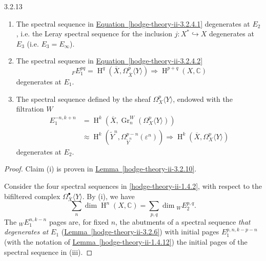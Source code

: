 \begin{corollary}{3.2.13}
    
 \begin{enumerate}
      
 \item[(i)]
        The spectral sequence in \hyperref[hodge-theory-ii-3.2.4.1]{Equation~\ref*{hodge-theory-ii-3.2.4.1}} degenerates at \(E_2\), i.e. the Leray spectral sequence for the inclusion \(j\colon  X^*\hookrightarrow  X\) degenerates at \(E_3\) (i.e. \(E_3=E_\infty \)).
      


      
 \item[(ii)]
        The spectral sequence in \hyperref[hodge-theory-ii-3.2.4.2]{Equation~\ref*{hodge-theory-ii-3.2.4.2}}
        \[           {}_FE_1^{pq}           = \operatorname {H}^q(\overline {X},\Omega _{\overline {X}}^p\langle  Y\rangle )           \Rightarrow  \operatorname {H}^{p+q}(X,\mathbb {C})         \]
        degenerates at \(E_1\).
      


      
 \item[(iii)]
        The spectral sequence defined by the sheaf \(\Omega _X^p\langle  Y\rangle \), endowed with the filtration \(W\)
        \[           \begin {aligned}             E_1^{-n,k+n}             &= \operatorname {H}^k(\overline {X},\operatorname {Gr}_n^W(\Omega _X^p\langle  Y\rangle ))           \\&\approx  \operatorname {H}^k(\widetilde {Y}^n,\Omega _{\widetilde {Y}^n}^{p-n}(\varepsilon ^n))             \Rightarrow  \operatorname {H}^k(\overline {X},\Omega _X^p\langle  Y\rangle )           \end {aligned}         \]
        degenerates at \(E_2\).
      

    \end{enumerate}\begin{proof}\par{}Claim (i) is proven in \hyperref[hodge-theory-ii-3.2.10]{Lemma~\ref*{hodge-theory-ii-3.2.10}}.\par{}Consider the four spectral sequences in \cref{hodge-theory-ii-1.4.2}, with respect to the bifiltered complex \(\Omega _{\overline {X}}^\bullet \langle  Y\rangle \).
      By (i), we have
      \[         \sum _n \dim \operatorname {H}^n(X,\mathbb {C})         = \sum _{p,q} \dim  {}_WE_2^{p,q}.       \]
      The \({}_WE_1^{n,k-n}\) pages are, for fixed \(n\), the abutments of a spectral sequence \emph{that degenerates at \(E_1\)} (\hyperref[hodge-theory-ii-3.2.6]{Lemma~\ref*{hodge-theory-ii-3.2.6}}) with initial pages \(E_1^{p,n,k-p-n}\) (with the notation of \hyperref[hodge-theory-ii-1.4.12]{Lemma~\ref*{hodge-theory-ii-1.4.12}}) the initial pages of the spectral sequence in (iii).
      

\end{proof}
\end{corollary}
